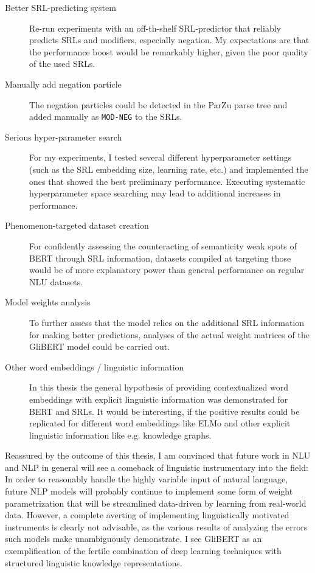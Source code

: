 \begin{description}
  \item[Better SRL-predicting system] Re-run experiments with an off-th-shelf SRL-predictor that reliably
    predicts SRLs and modifiers, especially negation. My expectations are that the performance boost would
    be remarkably higher, given the poor quality of the used SRLs.
  \item[Manually add negation particle] The negation particles could be detected in the ParZu parse
    tree and added manually as \texttt{MOD-NEG} to the SRLs.
  \item[Serious hyper-parameter search] For my experiments, I tested several different hyperparameter
    settings (such as the SRL embedding size, learning rate, etc.) and implemented the ones that
    showed the best preliminary performance. Executing systematic hyperparameter space searching may
    lead to additional increases in performance.
  \item[Phenomenon-targeted dataset creation] For confidently assessing the counteracting of semanticity
    weak spots of BERT through SRL information, datasets compiled at targeting those would be of more
    explanatory power than general performance on regular NLU datasets.
  \item[Model weights analysis] To further assess that the model relies on the additional SRL information for
    making better predictions, analyses of the actual weight matrices of the GliBERT model could be carried out.
  \item[Other word embeddings / linguistic information] In this thesis the general hypothesis of providing
    contextualized word embeddings with explicit linguistic information was demonstrated for BERT and SRLs.
    It would be interesting, if the positive results could be replicated for different word embeddings like
    ELMo and other explicit linguistic information like e.g. knowledge graphs.
\end{description}

Reassured by the outcome of this thesis, I am convinced that future work in
NLU and NLP in general will see a comeback of linguistic instrumentary into
the field: In order to reasonably handle the highly variable input of natural
language, future NLP models will probably continue to implement some form of
weight parametrization that will be streamlined data-driven by learning from
real-world data. However, a complete averting of implementing linguistically
motivated instruments is clearly not advisable, as the various results of
analyzing the errors such models make unambiguously demonstrate. I see GliBERT
as an exemplification of the fertile combination of deep learning techniques
with structured linguistic knowledge representations.

